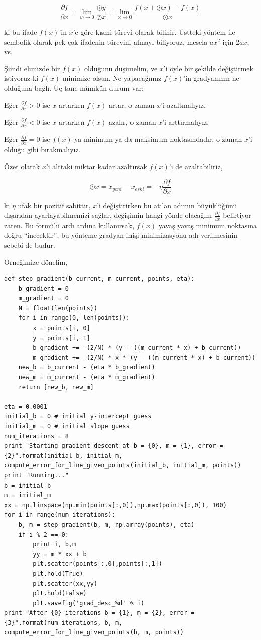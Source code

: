 \documentclass[12pt,fleqn]{article}\usepackage{../../common}
\begin{document}
$$ 
\frac{\partial f}{\partial x} =
\lim_{\oslash \to 0} \frac{\oslash y}{\oslash x} =
\lim_{\oslash \to 0} \frac{f(x + \oslash x) - f(x)}{\oslash x}
$$

ki bu ifade $f(x)$'in $x$'e göre kısmi türevi olarak bilinir. Üstteki yöntem ile
sembolik olarak pek çok ifadenin türevini almayı biliyoruz, mesela $ax^2$ için
$2ax$, vs.

Şimdi elimizde bir $f(x)$ olduğunu düşünelim, ve $x$'i öyle bir şekilde
değiştirmek istiyoruz ki $f(x)$ minimize olsun. Ne yapacağımız $f(x)$'in
gradyanının ne olduğuna bağlı. Üç tane mümkün durum var:

Eğer $\frac{\partial f}{\partial x} > 0$ ise $x$ artarken $f(x)$ artar, o zaman
$x$'i azaltmalıyız.

Eğer $\frac{\partial f}{\partial x} < 0$ ise $x$ artarken $f(x)$ azalır, o zaman
$x$'i arttırmalıyız.

Eğer $\frac{\partial f}{\partial x} = 0$ ise $f(x)$ ya minimum ya da maksimum
noktasındadır, o zaman $x$'i olduğu gibi bırakmalıyız.

Özet olarak $x$'i alttaki miktar kadar azaltırsak $f(x)$'i de azaltabiliriz,

$$ \oslash x = x_{yeni} - x_{eski} = -\eta  \frac{\partial f}{\partial x}$$

ki $\eta$ ufak bir pozitif sabittir, $x$'i değiştirirken bu atılan adımın
büyüklüğünü dışarıdan ayarlayabilmemizi sağlar, değişimin hangi yönde olacağını
$\frac{\partial f}{\partial x}$ belirtiyor zaten. Bu formülü ardı ardına
kullanırsak, $f(x)$ yavaş yavaş minimum noktasına doğru ``inecektir'', bu
yönteme gradyan inişi minimizasyonu adı verilmesinin sebebi de budur. 

Örneğimize dönelim, 

\begin{verbatim}
def step_gradient(b_current, m_current, points, eta):
    b_gradient = 0
    m_gradient = 0
    N = float(len(points))
    for i in range(0, len(points)):
        x = points[i, 0]
        y = points[i, 1]
        b_gradient += -(2/N) * (y - ((m_current * x) + b_current))
        m_gradient += -(2/N) * x * (y - ((m_current * x) + b_current))
    new_b = b_current - (eta * b_gradient)
    new_m = m_current - (eta * m_gradient)
    return [new_b, new_m]

eta = 0.0001
initial_b = 0 # initial y-intercept guess
initial_m = 0 # initial slope guess
num_iterations = 8
print "Starting gradient descent at b = {0}, m = {1}, error = {2}".format(initial_b, initial_m, compute_error_for_line_given_points(initial_b, initial_m, points))
print "Running..."
b = initial_b
m = initial_m
xx = np.linspace(np.min(points[:,0]),np.max(points[:,0]), 100)
for i in range(num_iterations):
    b, m = step_gradient(b, m, np.array(points), eta)
    if i % 2 == 0: 
        print i, b,m
        yy = m * xx + b
        plt.scatter(points[:,0],points[:,1])
        plt.hold(True)
        plt.scatter(xx,yy)
        plt.hold(False)
        plt.savefig('grad_desc_%d' % i)
print "After {0} iterations b = {1}, m = {2}, error = {3}".format(num_iterations, b, m, compute_error_for_line_given_points(b, m, points))    
\end{verbatim}
\end{document}
